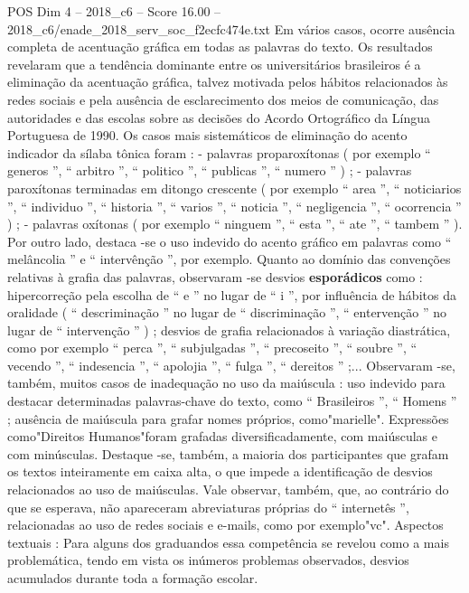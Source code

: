 \begin{textsample}{POS Dim 4 – 2018\_c6 – Score 16.00 – 2018\_c6/enade\_2018\_serv\_soc\_f2ecfc474e.txt}
Em vários casos, ocorre ausência completa de acentuação gráfica em todas as palavras do texto.
Os resultados revelaram que a tendência dominante entre os universitários brasileiros é a eliminação da acentuação gráfica, talvez motivada pelos hábitos relacionados às redes sociais e pela ausência de esclarecimento dos meios de comunicação, das autoridades e das escolas sobre as decisões do Acordo Ortográfico da Língua Portuguesa de 1990.
Os casos mais sistemáticos de eliminação do acento indicador da sílaba tônica foram : - palavras proparoxítonas ( por exemplo “ generos ”, “ arbitro ”, “ politico ”, “ publicas ”, “ numero ” ) ; - palavras paroxítonas terminadas em ditongo crescente ( por exemplo “ area ”, “ noticiarios ”, “ individuo ”, “ historia ”, “ varios ”, “ noticia ”, “ negligencia ”, “ ocorrencia ” ) ; - palavras oxítonas ( por exemplo “ ninguem ”, “ esta ”, “ ate ”, “ tambem ” ).
Por outro lado, destaca -se o uso indevido do acento gráfico em palavras como “ melâncolia ” e “ intervênção ”, por exemplo.
Quanto ao domínio das convenções relativas à grafia das palavras, observaram -se desvios \textbf{esporádicos} como : hipercorreção pela escolha de “ e ” no lugar de “ i ”, por influência de hábitos da oralidade ( “ descriminação ” no lugar de “ discriminação ”, “ entervenção ” no lugar de “ intervenção ” ) ; desvios de grafia relacionados à variação diastrática, como por exemplo “ perca ”, “ subjulgadas ”, “ precoseito ”, “ soubre ”, “ vecendo ”, “ indesencia ”, “ apolojia ”, “ fulga ”, “ dereitos ” ;...
Observaram -se, também, muitos casos de inadequação no uso da maiúscula : uso indevido para destacar determinadas palavras-chave do texto, como “ Brasileiros ”, “ Homens ” ; ausência de maiúscula para grafar nomes próprios, como"marielle".
Expressões como"Direitos Humanos"foram grafadas diversificadamente, com maiúsculas e com minúsculas.
Destaque -se, também, a maioria dos participantes que grafam os textos inteiramente em caixa alta, o que impede a identificação de desvios relacionados ao uso de maiúsculas.
Vale observar, também, que, ao contrário do que se esperava, não apareceram abreviaturas próprias do “ internetês ”, relacionadas ao uso de redes sociais e e-mails, como por exemplo"vc".
Aspectos textuais : Para alguns dos graduandos essa competência se revelou como a mais problemática, tendo em vista os inúmeros problemas observados, desvios acumulados durante toda a formação escolar.

\end{textsample}
